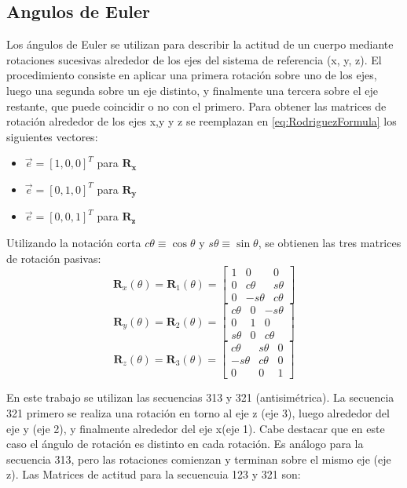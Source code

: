 \subsection{Angulos de Euler} 
Los ángulos de Euler se utilizan para describir la actitud de un cuerpo mediante rotaciones sucesivas alrededor de los ejes del sistema de referencia (x, y, z). El procedimiento consiste en aplicar una primera rotación sobre uno de los ejes, luego una segunda sobre un eje distinto, y finalmente una tercera sobre el eje restante, que puede coincidir o no con el primero. Para obtener las matrices de rotación alrededor de los ejes x,y y z se reemplazan en \ref{eq:RodriguezFormula} los siguientes vectores: 
\begin{itemize}
	\item $\vec{e}=[1,0,0]^T$ para $\mathbf{R_x}$
	\item $\vec{e}=[0,1,0]^T$ para $\mathbf{R_y}$
	\item $\vec{e}=[0,0,1]^T$ para $\mathbf{R_z}$
\end{itemize}
Utilizando la notación corta $c\theta \equiv \cos\theta$ y  $s\theta \equiv \sin\theta$, se obtienen las tres matrices de rotación pasivas: 
\begin{equation}
	\mathbf{R}_x(\theta) = \mathbf{R}_1(\theta)=
	\begin{bmatrix}
		 1 & 0&0\\
		 0 & c\theta & s\theta\\
		 0 & -s\theta & c\theta
	\end{bmatrix}
\end{equation}
\begin{equation}
	\mathbf{R}_y(\theta)= \mathbf{R}_2(\theta)=
	\begin{bmatrix}
		c\theta & 0& -s\theta\\
		0 & 1 & 0	\\
		s\theta & 0& c\theta
	\end{bmatrix}
\end{equation}
\begin{equation}
	\mathbf{R}_z(\theta) = \mathbf{R}_3(\theta)=
\begin{bmatrix}
	c\theta & s\theta& 0\\
	-s\theta  & c\theta & 0	\\
	0& 0& 1
\end{bmatrix}
\end{equation}


En este trabajo se utilizan las secuencias 313 y 321 (antisimétrica). La secuencia 321 primero se realiza una rotación en torno al eje z (eje 3), luego alrededor del eje y (eje 2), y finalmente alrededor del eje x(eje 1). Cabe destacar que en este caso el ángulo de rotación es distinto en cada rotación. Es análogo para la secuencia 313, pero las rotaciones comienzan y terminan sobre el mismo eje (eje z). Las Matrices de actitud para la secuencuia 123 y 321 son: 


